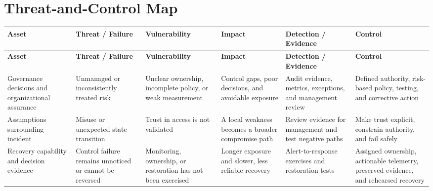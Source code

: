 \documentclass[11pt,letterpaper]{article}
\begin{document}
\section*{Threat-and-Control Map}
\begingroup\scriptsize\setlength{\tabcolsep}{2pt}
\begin{longtable}{>{\raggedright\arraybackslash}p{}>{\raggedright\arraybackslash}p{}>{\raggedright\arraybackslash}p{}>{\raggedright\arraybackslash}p{}>{\raggedright\arraybackslash}p{}>{\raggedright\arraybackslash}p{}}
\toprule\rowcolor{Navy}\color{white}\textbf{Asset} & \color{white}\textbf{Threat / Failure} & \color{white}\textbf{Vulnerability} & \color{white}\textbf{Impact} & \color{white}\textbf{Detection / Evidence} & \color{white}\textbf{Control}\\\midrule
\endfirsthead
\toprule\rowcolor{Navy}\color{white}\textbf{Asset} & \color{white}\textbf{Threat / Failure} & \color{white}\textbf{Vulnerability} & \color{white}\textbf{Impact} & \color{white}\textbf{Detection / Evidence} & \color{white}\textbf{Control}\\\midrule
\endhead
Governance decisions and organizational assurance & Unmanaged or inconsistently treated risk & Unclear ownership, incomplete policy, or weak measurement & Control gaps, poor decisions, and avoidable exposure & Audit evidence, metrics, exceptions, and management review & Defined authority, risk-based policy, testing, and corrective action\\\midrule
Assumptions surrounding incident & Misuse or unexpected state transition & Trust in access is not validated & A local weakness becomes a broader compromise path & Review evidence for management and test negative paths & Make trust explicit, constrain authority, and fail safely\\\midrule
Recovery capability and decision evidence & Control failure remains unnoticed or cannot be reversed & Monitoring, ownership, or restoration has not been exercised & Longer exposure and slower, less reliable recovery & Alert-to-response exercises and restoration tests & Assigned ownership, actionable telemetry, preserved evidence, and rehearsed recovery\\\midrule
\bottomrule
\end{longtable}
\endgroup
\end{document}
